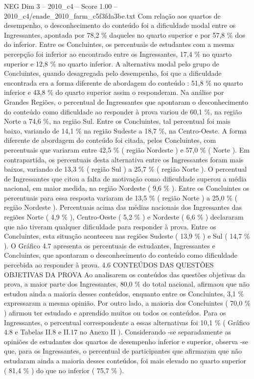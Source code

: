 \begin{textsample}{NEG Dim 3 – 2010\_c4 – Score 1.00 – 2010\_c4/enade\_2010\_farm\_c5f3fda3be.txt}
Com relação aos quartos de desempenho, o desconhecimento do conteúdo foi a dificuldade modal entre os Ingressantes, apontada por 78,2 \% daqueles no quarto superior e por 57,8 \% dos do inferior.
Entre os Concluintes, os percentuais de estudantes com a mesma percepção foi inferior ao encontrado entre os Ingressantes, 17,4 \% no quarto superior e 12,8 \% no quarto inferior.
A alternativa modal pelo grupo de Concluintes, quando desagregada pelo desempenho, foi que a dificuldade encontrada era a forma diferente de abordagem do conteúdo : 51,8 \% no quarto inferior e 43,8 \% do quarto superior assim o responderam.
Na análise por Grandes Regiões, o percentual de Ingressantes que apontaram o desconhecimento do conteúdo como dificuldade ao responder à prova variou de 60,1 \%, na região Norte a 74,6 \%, na região Sul.
Entre os Concluintes, tal percentual foi mais baixo, variando de 14,1 \% na região Sudeste a 18,7 \%, na Centro-Oeste.
A forma diferente de abordagem do conteúdo foi citada, pelos Concluintes, com percentuais que variaram entre 42,5 \% ( região Nordeste ) e 57,0 \% ( Norte ).
Em contrapartida, os percentuais desta alternativa entre os Ingressantes foram mais baixos, variando de 13,3 \% ( região Sul ) a 25,7 \% ( região Norte ).
O percentual de Ingressantes que citou a falta de motivação como dificuldade superou a média nacional, em maior medida, na região Nordeste ( 9,6 \% ).
Entre os Concluintes os percentuais para essa resposta variaram de 13,5 \% ( região Norte ) a 25,0 \% ( região Nordeste ).
Percentuais acima das médias nacionais dos Ingressantes das regiões Norte ( 4,9 \% ), Centro-Oeste ( 5,2 \% ) e Nordeste ( 6,6 \% ) declararam que não tiveram qualquer dificuldade para responder à prova.
Entre os Concluintes, esta situação aconteceu nas regiões Sudeste ( 13,9 \% ) e Sul ( 14,7 \% ).
O Gráfico 4.7 apresenta os percentuais de estudantes, Ingressantes e Concluintes, que apontaram o desconhecimento do conteúdo como dificuldade percebida ao responder à prova. 4.6 CONTEÚDOS DAS QUESTÕES OBJETIVAS DA PROVA Ao analisarem os conteúdos das questões objetivas da prova, a maior parte dos Ingressantes, 80,0 \% do total nacional, afirmaou que não estudou ainda a maioria desses conteúdos, enquanto entre os Concluintes, 3,1 \% expressaram a mesma opinião.
Por outro lado, a maioria dos Concluintes ( 70,0 \% ) afirmou ter estudado e aprendido muitos ou todos os conteúdos.
Para os Ingressantes, o percentual correspondente a essas alternativas foi 10,1 \% ( Gráfico 4.8 e Tabelas II.8 e II.17 no Anexo II ).
Considerando -se separadamente as opiniões de estudantes dos quartos de desempenho inferior e superior, observa -se que, para os Ingressantes, o percentual de participantes que afirmaram que não estudaram ainda a maioria desses conteúdos, foi mais elevado no quarto superior ( 81,4 \% ) do que no inferior ( 75,7 \% ).

\end{textsample}
